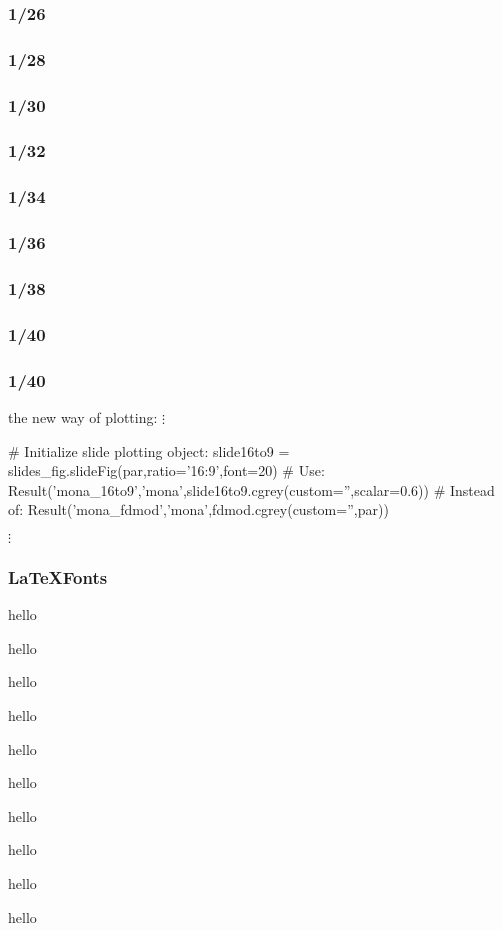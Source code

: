 \begin{frame}\frametitle{1/26}
\end{frame}

\begin{frame}\frametitle{1/28}
\end{frame}

\begin{frame}\frametitle{1/30}
\end{frame}

\begin{frame}\frametitle{1/32}
\end{frame}

\begin{frame}\frametitle{1/34}
\end{frame}

\begin{frame}\frametitle{1/36}
\end{frame}

\begin{frame}\frametitle{1/38}
\end{frame}

\begin{frame}\frametitle{1/40}
\end{frame}


\begin{frame}\frametitle{1/40}
\end{frame}
\usebackgroundtemplate{}

\begin{frame}
\end{frame}
\begin{frame}[fragile]{the new way of plotting:}
\centering
$\vdots$
\begin{python}
# Initialize slide plotting object:
slide16to9 = slides_fig.slideFig(par,ratio='16:9',font=20) 
# Use:
Result('mona_16to9','mona',slide16to9.cgrey(custom='',scalar=0.6)) 
# Instead of:
Result('mona_fdmod','mona',fdmod.cgrey(custom='',par))
\end{python}
$\vdots$

\end{frame}


\usebackgroundtemplate{}
\begin{frame}\frametitle{\LaTeX Fonts}
\centering
\tiny hello

\scriptsize hello

\footnotesize hello

\small hello

\normalsize hello

\large hello

\Large hello

\LARGE hello

\huge hello

\centering
\Huge hello

\end{frame}





